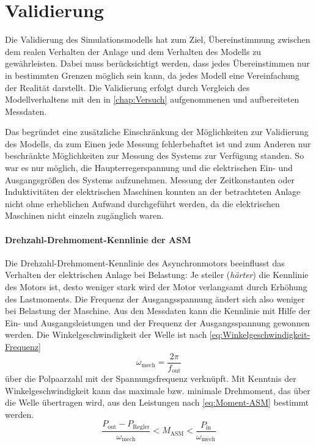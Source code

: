 \section{Validierung}
\label{sec:Validierung}
Die Validierung des Simulationsmodells hat zum Ziel, Übereinstimmung zwischen dem realen Verhalten der Anlage und dem Verhalten des Modells zu gewährleisten. Dabei muss berücksichtigt werden, dass jedes Übereinstimmen nur in bestimmten Grenzen möglich sein kann, da jedes Modell eine Vereinfachung der Realität darstellt. Die Validierung erfolgt durch Vergleich des Modellverhaltens mit den in \cref{chap:Versuch} aufgenommenen und aufbereiteten Messdaten. 

Das begründet eine zusätzliche Einschränkung der Möglichkeiten zur Validierung des Modells, da zum Einen jede Messung fehlerbehaftet ist und zum Anderen nur beschränkte Möglichkeiten zur Messung des Systems zur Verfügung standen. So war es nur möglich, die Haupterregerspannung und die elektrischen Ein- und Ausgangsgrößen des Systems aufzunehmen. Messung der Zeitkonstanten oder Induktivitäten der elektrischen Maschinen konnten an der betrachteten Anlage nicht ohne erheblichen Aufwand durchgeführt werden, da die elektrischen Maschinen nicht einzeln zugänglich waren.

\paragraph{Drehzahl-Drehmoment-Kennlinie der ASM}
Die Drehzahl-Drehmoment-Kennlinie des Asynchronmotors beeinflusst das Verhalten der elektrischen Anlage bei Belastung: Je steiler (\emph{härter}) die Kennlinie des Motors ist, desto weniger stark wird der Motor verlangsamt durch Erhöhung des Lastmoments. Die Frequenz der Ausgangsspannung ändert sich also weniger bei Belastung der Maschine. Aus den Messdaten kann die Kennlinie mit Hilfe der Ein- und Ausgangsleistungen und der Frequenz der Ausgangsspannung gewonnen werden. Die Winkelgeschwindigkeit der Welle ist nach \cref{eq:Winkelgeschwindigkeit-Frequenz} 
\begin{equation}
    \omega_{\mathrm{mech}} = \frac{2\pi}{f_{\mathrm{out}}} \label{eq:Winkelgeschwindigkeit-Frequenz}
\end{equation}
über die Polpaarzahl mit der Spannungsfrequenz verknüpft. Mit Kenntnis der Winkelgeschwindigkeit kann das maximale bzw. minimale Drehmoment, das über die Welle übertragen wird, aus den Leistungen nach \cref{eq:Moment-ASM} bestimmt werden.
\begin{equation}
    \frac{P_{\mathrm{out}} - P_{\mathrm{Regler}}}{\omega_{\mathrm{mech}}} < M_{\mathrm{ASM}} < \frac{P_{\mathrm{in}}}{\omega_{\mathrm{mech}}} \label{eq:Moment-ASM}
\end{equation}

